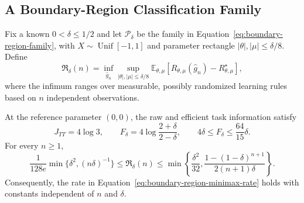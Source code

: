\subsection{A Boundary-Region Classification Family}
\label{app:classification-mechanism}

Fix a known $0<\delta\le1/2$ and let $\mathcal P_\delta$ be the family in Equation~\eqref{eq:boundary-region-family}, with $X\sim\operatorname{Unif}[-1,1]$ and parameter rectangle $|\theta|,|\mu|\le\delta/8$. Define
\[
\mathfrak R_\delta(n)=\inf_{\widehat g_n}\sup_{|\theta|,|\mu|\le\delta/8}
\mathbb E_{\theta,\mu}[R_{\theta,\mu}(\widehat g_n)-R_{\theta,\mu}^\star],
\]
where the infimum ranges over measurable, possibly randomized learning rules based on $n$ independent observations.

\begin{appendixproposition}
\label{prop:boundary-region-minimax}
At the reference parameter $(0,0)$, the raw and efficient task information satisfy
\[
J_{TT}=4\log3,
\qquad F_\delta=4\log\frac{2+\delta}{2-\delta},
\qquad 4\delta\le F_\delta\le\frac{64}{15}\delta.
\]
For every $n\ge1$,
\begin{equation}
\frac1{128e}\min\{\delta^2,(n\delta)^{-1}\}
\le\mathfrak R_\delta(n)
\le\min\left\{\frac{\delta^2}{32},
\frac{1-(1-\delta)^{n+1}}{2(n+1)\delta}\right\}.
\label{eq:boundary-region-finite-bounds}
\end{equation}
Consequently, the rate in Equation~\eqref{eq:boundary-region-minimax-rate} holds with constants independent of $n$ and $\delta$.
\end{appendixproposition}

